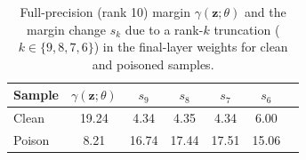\documentclass{article}
\theoremstyle{plain}
\theoremstyle{definition}
\theoremstyle{remark}
\begin{document}
\begin{table}[h]
\centering
\caption{Full-precision (rank 10) margin $\gamma(\mathbf z;\theta)$ and the margin change $s_k$ due to a rank-$k$ truncation ($k\in\{9,8,7,6\}$) in the final-layer weights for clean and poisoned samples.}
\label{tab:margin_sk}
\begin{tabular}{lcccccc}
\toprule
Sample   & $\gamma(\mathbf z;\theta)$  & $s_{9}$ & $s_{8}$ & $s_{7}$ & $s_{6}$  \\
\midrule
Clean     & 19.24 &  4.34 & 4.35 & 4.34 & 6.00 \\
Poison    & 8.21  & 16.74 & 17.44 & 17.51 & 15.06 \\
\bottomrule
\end{tabular}
\end{table}
\end{document}
